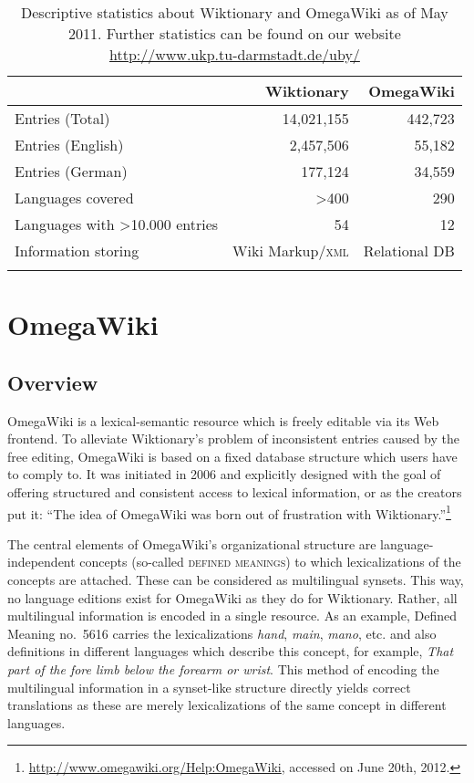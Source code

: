 \documentclass[output=paper]{LSP/langsci}
\begin{document}
\begin{table}[t]

\begin{tabular}{lrr}
  \lsptoprule
   & Wiktionary & OmegaWiki \\
  \midrule
  Entries (Total) & 14,021,155 & 442,723\\
  Entries (English) & 2,457,506	& 55,182\\
  Entries (German) & 177,124 & 34,559\\
  Languages covered & >400	& 290\\
  Languages with >10.000 entries  & 54	& 12\\
 Information storing & Wiki Markup/\textsc{xml}	& Relational DB\\

  \lspbottomrule
\end{tabular}
\caption{Descriptive statistics about Wiktionary and OmegaWiki as of May 2011. Further statistics can be found on our website \url{http://www.ukp.tu-darmstadt.de/uby/}
}
\label{tab:data}
\end{table}

\section{OmegaWiki}
\label{sec:matuschek:omegawiki}
\subsection{Overview}

OmegaWiki is a lexical-semantic resource which is freely editable via its Web frontend. To alleviate Wiktionary's problem of inconsistent entries caused by the free editing, OmegaWiki is based on a fixed database structure which users have to comply to. It was initiated in 2006 and explicitly designed with the goal of offering structured and consistent access to lexical information, or as the creators put it: ``The idea of OmegaWiki was born out of frustration with Wiktionary.''\footnote{\url{http://www.omegawiki.org/Help:OmegaWiki}, accessed on June 20th, 2012.}

The central elements of OmegaWiki's organizational structure are language-in\-de\-pend\-ent concepts (so-called \textsc{defined meanings}) to which lexicalizations of the concepts are attached.  These can be considered as multilingual synsets. This way, no language editions exist for OmegaWiki as they do for Wiktionary. Rather, all multilingual information is encoded in a single resource. As an example, Defined Meaning no.~5616 carries the lexicalizations \textit{hand}, \textit{main}, \textit{mano}, etc. and also definitions in different languages which describe this concept, for example, \textit{That part of the fore limb below the forearm or wrist}. This method of encoding the multilingual information in a synset-like structure directly yields correct translations as these are merely lexicalizations of the same concept in different languages.
\end{document}
